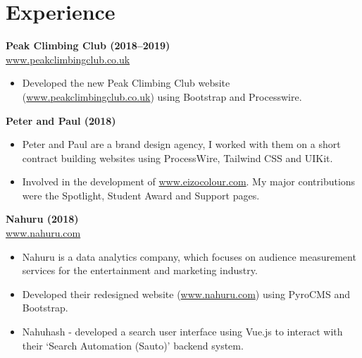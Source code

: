 \documentclass[11pt,a4paper,sans]{moderncv}
\begin{document}
\section{Experience}

\begin{small}
\textbf{Peak Climbing Club (2018--2019)}\\
\href{http://www.peakclimbingclub.co.uk}{www.peakclimbingclub.co.uk}
\begin{itemize}%
\item Developed the new Peak Climbing Club website (\href{http://www.peakclimbingclub.co.uk}{www.peakclimbingclub.co.uk}) using Bootstrap and Processwire. 
\end{itemize}
\textbf{Peter and Paul (2018)}
\begin{itemize}
\item Peter and Paul are a brand design agency, I worked with them on a short contract building websites using ProcessWire, Tailwind CSS and UIKit.
\item Involved in the development of \href{http://www.eizocolour.com}{www.eizocolour.com}. My major contributions were the Spotlight, Student Award and Support pages. 
\end{itemize}

\textbf{Nahuru (2018)}\\
\href{http://www.nahuru.com}{www.nahuru.com}
\begin{itemize}%
\item Nahuru is a data analytics company, which focuses on audience measurement services for the entertainment and marketing industry.
\item Developed their redesigned website (\href{http://www.nahuru.com}{www.nahuru.com}) using PyroCMS and Bootstrap.
\item Nahuhash - developed a search user interface using Vue.js to interact with their `Search Automation (Sauto)' backend system. \\
\end{itemize}

\end{small}
\end{document}
